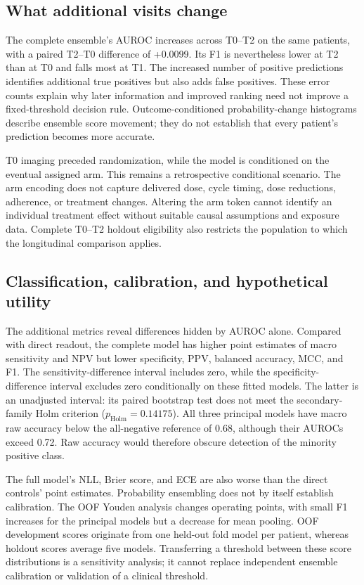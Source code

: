 \subsection{What additional visits change}
The complete ensemble's AUROC increases across T0--T2 on the same patients, with a paired T2--T0 difference of +0.0099. Its F1 is nevertheless lower at T2 than at T0 and falls most at T1. The increased number of positive predictions identifies additional true positives but also adds false positives. These error counts explain why later information and improved ranking need not improve a fixed-threshold decision rule. Outcome-conditioned probability-change histograms describe ensemble score movement; they do not establish that every patient's prediction becomes more accurate.

T0 imaging preceded randomization, while the model is conditioned on the eventual assigned arm. This remains a retrospective conditional scenario. The arm encoding does not capture delivered dose, cycle timing, dose reductions, adherence, or treatment changes. Altering the arm token cannot identify an individual treatment effect without suitable causal assumptions and exposure data. Complete T0--T2 holdout eligibility also restricts the population to which the longitudinal comparison applies.

\subsection{Classification, calibration, and hypothetical utility}
The additional metrics reveal differences hidden by AUROC alone. Compared with direct readout, the complete model has higher point estimates of macro sensitivity and NPV but lower specificity, PPV, balanced accuracy, MCC, and F1. The sensitivity-difference interval includes zero, while the specificity-difference interval excludes zero conditionally on these fitted models. The latter is an unadjusted interval: its paired bootstrap test does not meet the secondary-family Holm criterion ($p_{\mathrm{Holm}}=0.14175$). All three principal models have macro raw accuracy below the all-negative reference of 0.68, although their AUROCs exceed 0.72. Raw accuracy would therefore obscure detection of the minority positive class.

The full model's NLL, Brier score, and ECE are also worse than the direct controls' point estimates. Probability ensembling does not by itself establish calibration. The OOF Youden analysis changes operating points, with small F1 increases for the principal models but a decrease for mean pooling. OOF development scores originate from one held-out fold model per patient, whereas holdout scores average five models. Transferring a threshold between these score distributions is a sensitivity analysis; it cannot replace independent ensemble calibration or validation of a clinical threshold.

